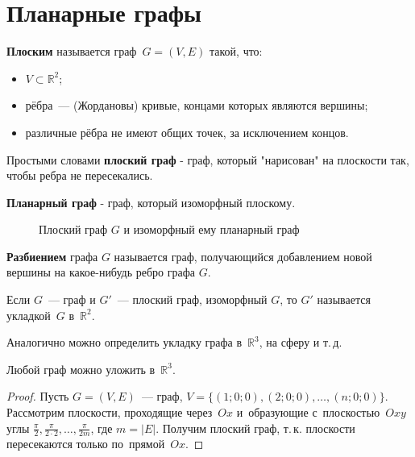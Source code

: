\section{Планарные графы}
\textbf{Плоским} называется граф~$G = (V, E)$ такой, что:
\begin{itemize}
	\item $V \subset \mathbb R^2$;
	\item рёбра~--- (Жордановы) кривые, концами которых являются вершины;
	\item различные рёбра не имеют общих точек, за исключением концов.
\end{itemize}

Простыми словами \textbf{плоский граф} - граф, который "нарисован" на плоскости так, чтобы ребра не пересекались.

\textbf{Планарный граф} - граф, который изоморфный плоскому.

\begin{figure}[h!]
	\begin{center}
		
	\end{center}
	\caption{Плоский граф $G$ и изоморфный ему планарный граф}
	\label{pgraph}
\end{figure}

\textbf{Разбиением} графа $G$ называется граф, получающийся добавлением новой вершины на какое-нибудь ребро графа $G$.

Если $G$~--- граф и $G'$~--- плоский граф, изоморфный $G$, то $G'$ называется укладкой~$G$ в~$\mathbb R^2$.

Аналогично можно определить укладку графа в~$\mathbb R^3$, на сферу и т.\,д.

\begin{theorem}
	Любой граф можно уложить в~$\mathbb R^3$.
\end{theorem}
\begin{proof}
	Пусть $G = (V, E)$~--- граф, $V = \{ (1; 0; 0), (2; 0; 0), \ldots, (n; 0; 0) \}$.
	Рассмотрим плоскости, проходящие через~$Ox$ и~образующие с~плоскостью~$Oxy$ углы $\frac\pi2, \frac\pi{2\cdot2}, \ldots, \frac\pi{2m}$, где $m = |E|$.
	Получим плоский граф, т.\,к. плоскости пересекаются только по~прямой~$Ox$.
\end{proof}

